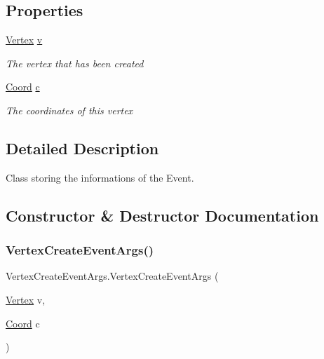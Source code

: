 \subsection*{Properties}
\begin{DoxyCompactItemize}
\item 
\hyperlink{structVertex}{Vertex} \hyperlink{classVertexCreateEventArgs_a6ce40981e1826b6d52987abf3382172a}{v}
\begin{DoxyCompactList}\small\item\em The vertex that has been created\end{DoxyCompactList}\item 
\hyperlink{structCoord}{Coord} \hyperlink{classVertexCreateEventArgs_a69cf9a65e5ecd6f26cafa1141bad6e0c}{c}
\begin{DoxyCompactList}\small\item\em The coordinates of this vertex\end{DoxyCompactList}\end{DoxyCompactItemize}


\subsection{Detailed Description}
Class storing the informations of the Event. 



\subsection{Constructor \& Destructor Documentation}
\mbox{\label{classVertexCreateEventArgs_ad9b5487ebecc3eae5d6d0e8363efe52c}} 
\subsubsection{\texorpdfstring{Vertex\+Create\+Event\+Args()}{VertexCreateEventArgs()}}
{\footnotesize\ttfamily Vertex\+Create\+Event\+Args.\+Vertex\+Create\+Event\+Args (\begin{DoxyParamCaption}\item[{\hyperlink{structVertex}{Vertex}}]{v,  }\item[{\hyperlink{structCoord}{Coord}}]{c }\end{DoxyParamCaption})\hspace{0.3cm}{\ttfamily [inline]}}



